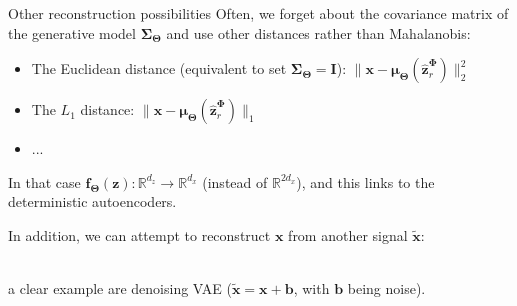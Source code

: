 \documentclass{beamer}
\newcommand{\bs}[1]{\boldsymbol{#1}}
\begin{document}
\begin{frame}{Other reconstruction possibilities}
 Often, we forget about the covariance matrix of the generative model $\bs{\Sigma}_{\bs{\Theta}}$ and use other distances rather than Mahalanobis:
 \begin{itemize}
  \item The Euclidean distance (equivalent to set $\bs{\Sigma}_{\bs{\Theta}}=\bs{I}$): $\lVert \bs{x}-\bs{\mu}_{\bs{\Theta}}(\hat{\bs{z}}_r^{\bs{\Phi}})\rVert^2_2$
  \item The $L_1$ distance: $\lVert \bs{x}-\bs{\mu}_{\bs{\Theta}}(\hat{\bs{z}}_r^{\bs{\Phi}})\rVert_1$
  \item ...
 \end{itemize}

 In that case $\bs{f}_{\bs{\Theta}}(\bs{z}):\mathbb{R}^{d_z}\rightarrow\mathbb{R}^{d_x}$ (instead of $\mathbb{R}^{2d_x}$), and this links to the deterministic autoencoders.\vspace{6mm}
 
 In addition, we can attempt to reconstruct $\bs{x}$ from another signal $\tilde{\bs{x}}$:
 \\
 a clear example are denoising VAE ($\tilde{\bs{x}}=\bs{x}+\bs{b}$, with $\bs{b}$ being noise).\vspace{-3mm}
\end{frame}
\end{document}
